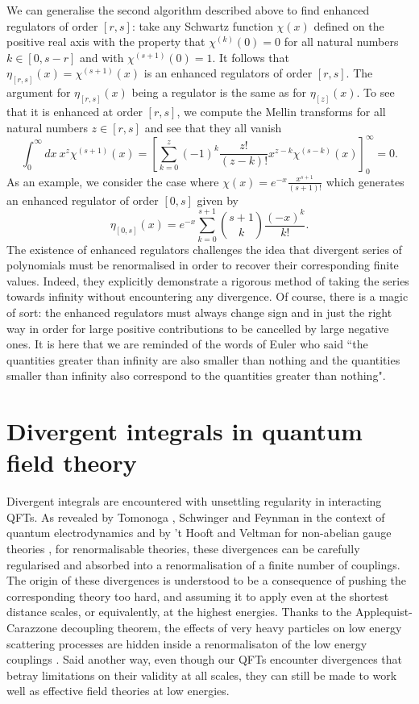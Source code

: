 \documentclass[12pt, letter]{article}
\def\be{\begin{equation}}
\def\ee{\end{equation}}
\begin{document}
We can generalise the second algorithm  described above to find enhanced regulators of order $[r, s]$: take any Schwartz function $\chi(x)$ defined on the positive real axis with the property that $\chi^{(k)}(0)=0$ for all natural numbers $k \in [0,s-r]$ and with $\chi^{(s+1)}(0)=1$. It follows that $\eta_{[r,s]}(x)=\chi^{(s+1)}(x)$ is an enhanced regulators of order $[r,s]$.  The argument for $\eta_{[r,s]}(x)$ being a regulator is the same as for $\eta_{[z]}(x)$. To see that it is enhanced at order $[r,s]$, we compute the Mellin transforms for all natural numbers $z\in [r, s]$ and see that they all vanish
\be
\int_0^\infty dx  \ x^z\chi^{(s+1)}(x)=\left[ \sum_{k=0}^{z} (-1)^k \frac{z!}{(z-k)!} x^{z-k} \chi^{(s-k)}(x)\right]^\infty_0=0.
\ee
As an example, we consider the case where $\chi(x)=e^{-x} \frac{x^{s+1}}{(s+1)!}$ which generates an enhanced regulator of order $[0,s]$ given by
\be
\eta_{[0, s]}(x)=e^{-x} \sum_{k=0}^{s+1} \binom{s+1}{k} \frac{(-x)^k}{k!}.
\ee
The existence of enhanced regulators challenges the idea that divergent series of polynomials must be renormalised in order to recover their corresponding finite values. Indeed, they  explicitly demonstrate  a rigorous method of taking the series towards infinity without encountering any divergence. Of course, there is a magic of sort: the enhanced regulators must always change sign and in just the right way in order for large positive contributions to be cancelled by large negative ones.  It is here that we are reminded of the words of Euler who said ``the quantities greater than infinity are also smaller than nothing and the quantities smaller than infinity also correspond to the quantities greater than nothing"\citep{Euler18DeSeriebusDivergentibus}.



\section{Divergent integrals in quantum field theory}\label{SecDivIntegrals}
Divergent integrals are encountered with unsettling regularity in interacting QFTs. As revealed by Tomonoga \cite{Tomonaga:1946zz}, Schwinger \cite{Schwinger:1948iu} and Feynman \cite{Feynman:1948fi} in the context of quantum electrodynamics and by 't Hooft and Veltman for non-abelian gauge theories \cite{tHooft:1972tcz},  for renormalisable theories, these divergences can be carefully regularised and absorbed into a renormalisation of a finite number of couplings.  The origin of these divergences is understood to be a consequence of pushing the corresponding theory too hard, and assuming it to apply even at the shortest distance scales, or equivalently, at the highest energies.  Thanks to the Applequist-Carazzone decoupling theorem, the effects of very heavy particles on low energy scattering processes are hidden inside a renormalisaton of the low energy couplings \cite{Appelquist:1974tg}.  Said another way, even though our QFTs encounter divergences that betray limitations on their validity at all scales, they can still be made to work well as effective field theories at low energies.
\end{document}
